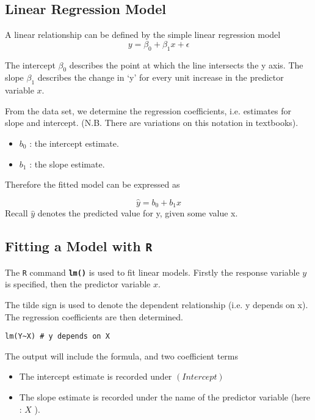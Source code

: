 \documentclass[a4paper,12pt]{article}
\begin{document}
\subsection{Linear Regression Model}

A linear relationship can be defined by the simple linear regression model
\[y = \beta_0 + \beta_1x + \epsilon\]

The intercept $\beta_0$ describes the point at which the line intersects the y axis.
The slope $\beta_1$ describes the change in ‘y’ for every unit increase in the predictor variable $x$.

From the data set, we determine the regression coefficients, i.e. estimates for slope and intercept. (N.B. There are variations on this notation in textbooks).

\begin{itemize}	\item $b_0$ : the intercept estimate.
\item	$b_1$ : the slope estimate.
\end{itemize}

Therefore the fitted model can be expressed as

\[ \hat{y} = b_0 + b_1x \]
Recall $\hat{y}$  denotes the predicted value for y, given some value x.

\subsection{Fitting a Model with \texttt{R}}

The  \texttt{R} command   \texttt{\textbf{lm()}} is used to fit linear models. Firstly the response variable $y$  is specified, then the predictor variable $x$.

The tilde sign is used to denote the dependent relationship (i.e. y depends on x). The regression coefficients are then determined.

\begin{framed}
\begin{verbatim}
lm(Y~X) # y depends on X
\end{verbatim}
\end{framed}

The output will include the formula, and two coefficient terms
\begin{itemize}
\item The intercept estimate is recorded under $(Intercept)$
\item The slope estimate is recorded under the name of the predictor variable (here : $X$ ).
\end{itemize}	
	
\end{document}
